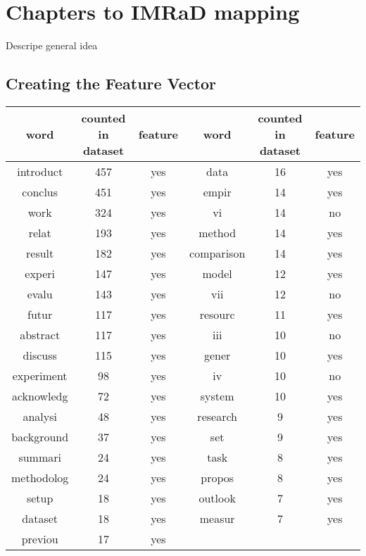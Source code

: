 \section{Chapters to IMRaD mapping}
\label{sec:chapters-to-imrad-mapping}

Descripe general idea

\subsection{Creating the Feature Vector}
\label{subsec:creating-feature-vector}

\begin{tabular}{| c | c | c || c | c | c |}
\hline
\rowcolor{lightblue}
\textbf{word} & \textbf{counted in datase}t & \textbf{feature} & \textbf{word} & \textbf{counted in datase}t & \textbf{feature} \\ \hline
introduct & 457 & yes & data & 16 & yes \\ \hline
conclus & 451 & yes & empir & 14 & yes \\ \hline
work & 324 & yes & vi & 14 & no \\ \hline
relat & 193 & yes & method & 14 & yes \\ \hline
result & 182 & yes & comparison & 14 & yes \\ \hline
experi & 147 & yes & model & 12 & yes \\ \hline
evalu & 143 & yes & vii & 12 & no \\ \hline
futur & 117 & yes & resourc & 11 & yes \\ \hline
abstract & 117 & yes & iii & 10 & no \\ \hline
discuss & 115 & yes & gener & 10 & yes \\ \hline
experiment & 98 & yes & iv & 10 & no \\ \hline
acknowledg & 72 & yes & system & 10 & yes \\ \hline
analysi & 48 & yes & research & 9 & yes \\ \hline
background & 37 & yes & set & 9 & yes \\ \hline
summari & 24 & yes & task & 8 & yes \\ \hline
methodolog & 24 & yes & propos & 8 & yes \\ \hline
setup & 18 & yes & outlook & 7 & yes \\ \hline
dataset & 18 & yes & measur & 7 & yes \\ \hline
previou & 17 & yes & & &\\ \hline
\end{tabular}

